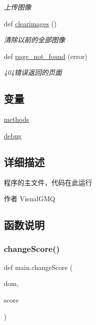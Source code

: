 \begin{DoxyCompactItemize}
\begin{DoxyCompactList}\small\item\em 上传图像 \end{DoxyCompactList}\item 
def \mbox{\hyperlink{group___xE8_xB7_xAF_xE7_x94_xB1_xE5_x87_xBD_xE6_x95_xB0_gaf30661faaa34905b65c282bff34ede37}{clearimages}} ()
\begin{DoxyCompactList}\small\item\em 清除以前的全部图像 \end{DoxyCompactList}\item 
def \mbox{\hyperlink{group___xE8_xB7_xAF_xE7_x94_xB1_xE5_x87_xBD_xE6_x95_xB0_ga965cff435fee73194b14e9a6a7f3f2b8}{page\+\_\+not\+\_\+found}} (error)
\begin{DoxyCompactList}\small\item\em 404错误返回的页面 \end{DoxyCompactList}\end{DoxyCompactItemize}
\subsection*{变量}
\begin{DoxyCompactItemize}
\item 
\mbox{\hyperlink{group___xE8_xB7_xAF_xE7_x94_xB1_xE5_x87_xBD_xE6_x95_xB0_gad0a71fa7b4080e971323a6c3b1c16331}{methods}}
\item 
\mbox{\hyperlink{namespacemain_a800974c07a8e7de9888fff8cd98a827e}{debug}}
\end{DoxyCompactItemize}


\subsection{详细描述}
程序的主文件，代码在此运行 

\begin{DoxyAuthor}{作者}
Visual\+G\+MQ 
\end{DoxyAuthor}


\subsection{函数说明}
\mbox{\label{namespacemain_a4f4216d6a8208604c32b24da5feeaf68}} 
\subsubsection{\texorpdfstring{changeScore()}{changeScore()}}
{\footnotesize\ttfamily def main.\+change\+Score (\begin{DoxyParamCaption}\item[{}]{dom,  }\item[{}]{score }\end{DoxyParamCaption})}



